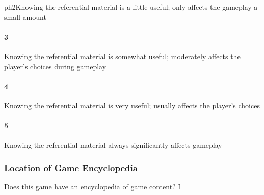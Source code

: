 ph{2}Knowing the referential material is a little useful; only affects the gameplay a small amount\paragraph{3}Knowing the referential material is somewhat useful; moderately affects the player's choices during gameplay\paragraph{4}Knowing the referential material is very useful; usually affects the player's choices\paragraph{5}Knowing the referential material always significantly affects gameplay\subsubsection{Location of Game Encyclopedia}Does this game have an encyclopedia of game content? I